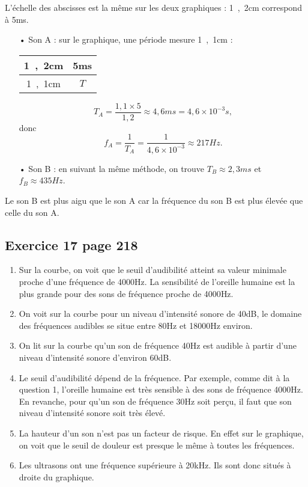 \documentclass[12pt,a4paper,fleqn]{article}
\begin{document}
L'échelle des abscisses est la même sur les deux graphiques : \unit{1{,}2}{cm} correspond à \unit{5}{ms}.
\begin{itemize}
\item[•] Son A : sur le graphique, une période mesure \unit{1{,}1}{cm} :
\begin{center}
\begin{tabular}{c|c}
\unit{1{,}2}{cm} & \unit{5}{ms} \\
\hline
\unit{1{,}1}{cm} & $T$ 
\end{tabular}
\end{center}
\[
T_A = \frac{1{,}1 \times 5}{1{,}2} \approx \unit{4{,}6}{ms} = \unit{4{,}6\times10^{-3}}{s},
\]
donc
\[
f_A = \frac{1}{T_A} = \frac{1}{4{,}6\times10^{-3}} \approx \unit{217}{Hz}.
\]
\item[•] Son B : en suivant la même méthode, on trouve $T_B \approx \unit{2{,}3}{ms}$ et $f_B \approx \unit{435}{Hz}$.
\end{itemize}
Le son B est plus aigu que le son A car la fréquence du son B est plus élevée que celle du son A.

\subsection*{Exercice 17 page 218}

\begin{enumerate}
\item Sur la courbe, on voit que le seuil d'audibilité atteint sa valeur minimale proche d'une fréquence de \unit{4000}{Hz}.
La sensibilité de l'oreille humaine est la plus grande pour des sons de fréquence proche de \unit{4000}{Hz}.
\item On voit sur la courbe pour un niveau d'intensité sonore de \unit{40}{dB}, le domaine des fréquences audibles se situe entre \unit{80}{Hz} et \unit{18000}{Hz} environ.
\item On lit sur la courbe qu'un son de fréquence \unit{40}{Hz} est audible à partir d'une niveau d'intensité sonore d'environ \unit{60}{dB}.
\item Le seuil d'audibilité dépend de la fréquence.
Par exemple, comme dit à la question 1, l'oreille humaine est très sensible à des sons de fréquence \unit{4000}{Hz}.
En revanche, pour qu'un son de fréquence \unit{30}{Hz} soit perçu, il faut que son niveau d'intensité sonore soit très élevé.
\item La hauteur d'un son n'est pas un facteur de risque.
En effet sur le graphique, on voit que le seuil de douleur est presque le même à toutes les fréquences.
\item Les ultrasons ont une fréquence supérieure à \unit{20}{kHz}.
Ils sont donc situés à droite du graphique.
\end{enumerate}
\end{document}
